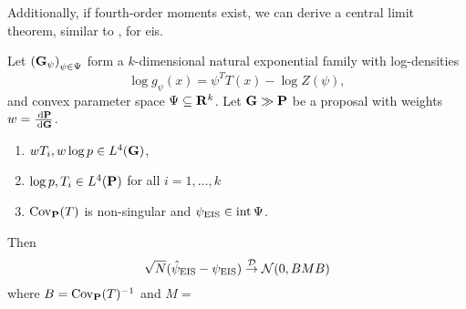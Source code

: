 Additionally, if fourth-order moments exist, we can derive a central limit theorem, similar to , for \acrshort{eis}.

\begin{theorem}
    \label{thm:eis-clt}
    Let $\left( \G_{\psi} \right)_{\psi \in \Psi}$ form a $k$-dimensional natural exponential family with log-densities 
    $$
    \log g_{\psi}(x) = \psi^{T} T(x) - \log Z(\psi),
    $$
    and convex parameter space $\Psi \subseteq \R^{k}$. Let $\G \gg \P$ be a proposal with weights $w = \rnd{\P}{\G}$. 

    \begin{enumerate}
        \item $w T_{i}, w \log p \in L^{4}(\G)$,
        \item\label{it:fourthmomentsexist} $\log p, T_i \in L^{4}(\P)$ for all $i = 1, \dots, k$
        \item $\cov_{\P}(T)$ is non-singular and $\peis \in \operatorname{int} \Psi$.
    \end{enumerate}

    Then 
    $$
        \sqrt{N} (\hpeis - \peis) \convD \Normal (0, BMB)
    $$
    where $B = \cov_{\P}(T)^{-1}$ and $M = $
\end{theorem}

